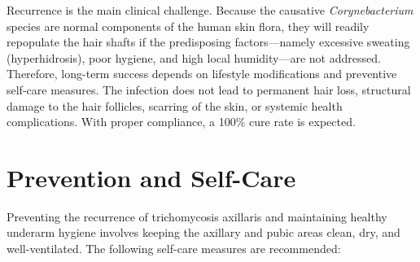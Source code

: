 Recurrence is the main clinical challenge. Because the causative \textit{Corynebacterium} species are normal components of the human skin flora, they will readily repopulate the hair shafts if the predisposing factors---namely excessive sweating (hyperhidrosis), poor hygiene, and high local humidity---are not addressed. Therefore, long-term success depends on lifestyle modifications and preventive self-care measures. The infection does not lead to permanent hair loss, structural damage to the hair follicles, scarring of the skin, or systemic health complications. With proper compliance, a 100\% cure rate is expected.

\section*{Prevention and Self-Care}
Preventing the recurrence of trichomycosis axillaris and maintaining healthy underarm hygiene involves keeping the axillary and pubic areas clean, dry, and well-ventilated. The following self-care measures are recommended:

